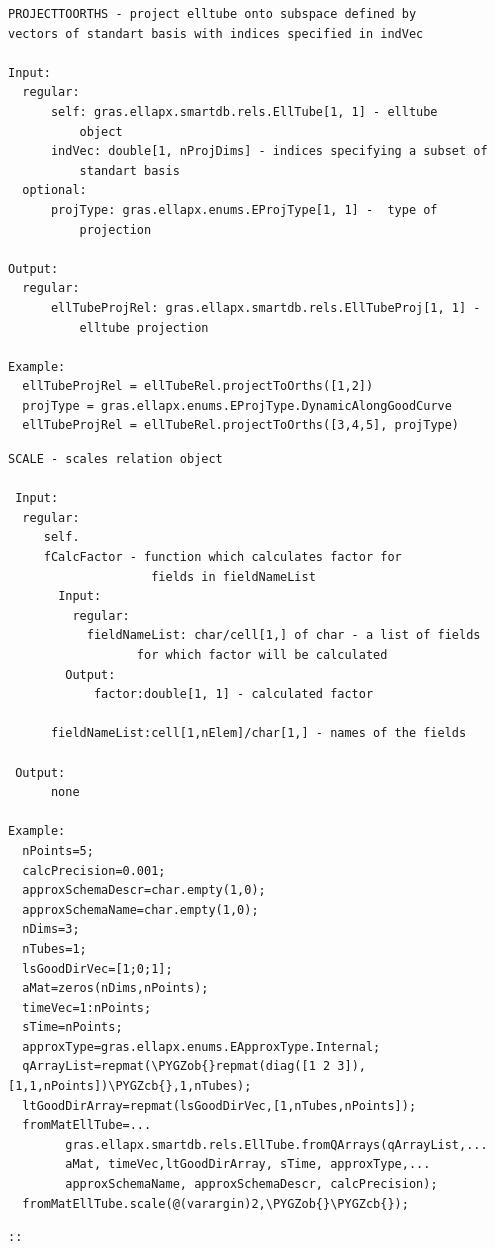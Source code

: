\documentclass[letterpaper,10pt,english]{sphinxmanual}
\def\PYGZob{\char`\{}
\def\PYGZcb{\char`\}}
\begin{document}
\begin{Verbatim}[commandchars=\\\{\}]
PROJECTTOORTHS - project elltube onto subspace defined by
vectors of standart basis with indices specified in indVec

Input:
  regular:
      self: gras.ellapx.smartdb.rels.EllTube[1, 1] - elltube
          object
      indVec: double[1, nProjDims] - indices specifying a subset of
          standart basis
  optional:
      projType: gras.ellapx.enums.EProjType[1, 1] -  type of
          projection

Output:
  regular:
      ellTubeProjRel: gras.ellapx.smartdb.rels.EllTubeProj[1, 1] -
          elltube projection

Example:
  ellTubeProjRel = ellTubeRel.projectToOrths([1,2])
  projType = gras.ellapx.enums.EProjType.DynamicAlongGoodCurve
  ellTubeProjRel = ellTubeRel.projectToOrths([3,4,5], projType)
\end{Verbatim}

\begin{Verbatim}[commandchars=\\\{\}]
SCALE - scales relation object

 Input:
  regular:
     self.
     fCalcFactor - function which calculates factor for
                    fields in fieldNameList
       Input:
         regular:
           fieldNameList: char/cell[1,] of char - a list of fields
                  for which factor will be calculated
        Output:
            factor:double[1, 1] - calculated factor

      fieldNameList:cell[1,nElem]/char[1,] - names of the fields

 Output:
      none

Example:
  nPoints=5;
  calcPrecision=0.001;
  approxSchemaDescr=char.empty(1,0);
  approxSchemaName=char.empty(1,0);
  nDims=3;
  nTubes=1;
  lsGoodDirVec=[1;0;1];
  aMat=zeros(nDims,nPoints);
  timeVec=1:nPoints;
  sTime=nPoints;
  approxType=gras.ellapx.enums.EApproxType.Internal;
  qArrayList=repmat(\PYGZob{}repmat(diag([1 2 3]),[1,1,nPoints])\PYGZcb{},1,nTubes);
  ltGoodDirArray=repmat(lsGoodDirVec,[1,nTubes,nPoints]);
  fromMatEllTube=...
        gras.ellapx.smartdb.rels.EllTube.fromQArrays(qArrayList,...
        aMat, timeVec,ltGoodDirArray, sTime, approxType,...
        approxSchemaName, approxSchemaDescr, calcPrecision);
  fromMatEllTube.scale(@(varargin)2,\PYGZob{}\PYGZcb{});
\end{Verbatim}

\begin{Verbatim}[commandchars=\\\{\}]
::
\end{Verbatim}
\end{document}
